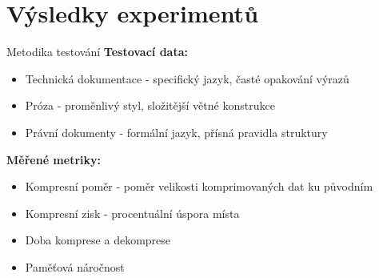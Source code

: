 \documentclass[lualatex,hyperref={pdfencoding=auto}]{beamer}
\begin{document}
\section{Výsledky experimentů}
\begin{frame}{Metodika testování}
  \textbf{Testovací data:}
  \begin{itemize}
    \item Technická dokumentace - specifický jazyk, časté opakování výrazů
    \item Próza - proměnlivý styl, složitější větné konstrukce
    \item Právní dokumenty - formální jazyk, přísná pravidla struktury
  \end{itemize}
  \vspace{2mm}
  \textbf{Měřené metriky:}
  \begin{itemize}
    \item Kompresní poměr - poměr velikosti komprimovaných dat ku původním
    \item Kompresní zisk - procentuální úspora místa
    \item Doba komprese a dekomprese
    \item Paměťová náročnost
  \end{itemize}
\end{frame}
\end{document}
